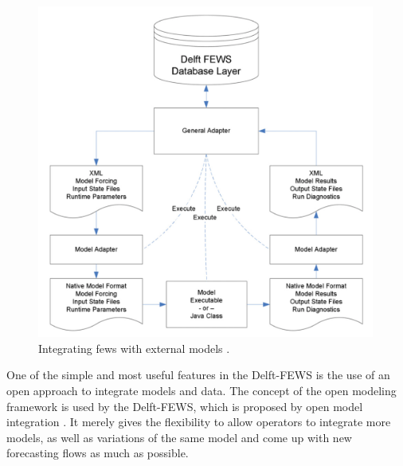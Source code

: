 \begin{figure}[ht]
    \centering
    \includegraphics[width=0.99\textwidth]{lit/fews/Linking-Delft-FEWS-with-external-models-The-fi-gure-shows-the-fl-ow-of-data-through-XML_W640.png}
    \caption[\acrshort{fews} integration with external models]{Integrating \acrshort{fews} with external models \cite{Werner2013TheSystem}.}
    \label{fi:fews_general_adapter}
\end{figure}

One of the simple and most useful features in the Delft-FEWS is the use of an open approach to integrate models and data. The concept of the open modeling framework is used by the Delft-FEWS, which is proposed by open model integration \cite{Kokkonen2003InterfacingXML}. It merely gives the flexibility to allow operators to integrate more models, as well as variations of the same model and come up with new forecasting flows as much as possible.


